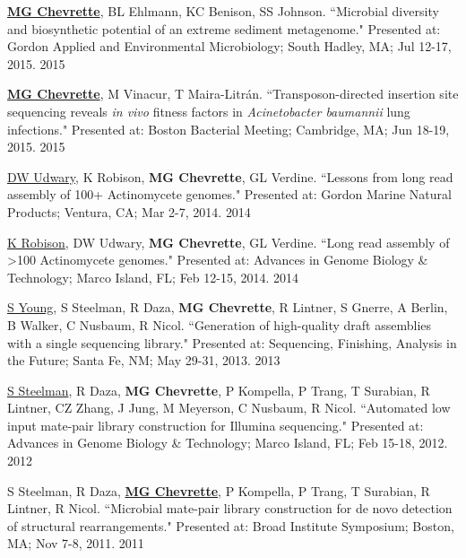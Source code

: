 \begin{cvpubs}
\cvpub
{\textbf{\underline{MG Chevrette}}, BL Ehlmann, KC Benison, SS Johnson. ``Microbial diversity and biosynthetic potential of an extreme sediment metagenome." Presented at: Gordon Applied and Environmental Microbiology; South Hadley, MA; Jul 12-17, 2015.}
{2015}

\cvpub
{\textbf{\underline{MG Chevrette}}, M Vinacur, T Maira-Litr\'{a}n. ``Transposon-directed insertion site sequencing reveals \textit{in vivo} fitness factors in \textit{Acinetobacter baumannii} lung infections." Presented at: Boston Bacterial Meeting; Cambridge, MA; Jun 18-19, 2015.}
{2015}

\cvpub
{\underline{DW Udwary}, K Robison, \textbf{MG Chevrette}, GL Verdine. ``Lessons from long read assembly of 100+ Actinomycete genomes." Presented at: Gordon Marine Natural Products; Ventura, CA; Mar 2-7, 2014.}
{2014}

\cvpub
{\underline{K Robison}, DW Udwary, \textbf{MG Chevrette}, GL Verdine. ``Long read assembly of >100 Actinomycete genomes." Presented at: Advances in Genome Biology \& Technology; Marco Island, FL; Feb 12-15, 2014.}
{2014}

\cvpub
{\underline{S Young}, S Steelman, R Daza, \textbf{MG Chevrette}, R Lintner, S Gnerre, A Berlin, B Walker, C Nusbaum, R Nicol. ``Generation of high-quality draft assemblies with a single sequencing library." Presented at: Sequencing, Finishing, Analysis in the Future; Santa Fe, NM; May 29-31, 2013.}
{2013}

\end{cvpubs} \begin{cvpubs}

\cvpub
{\underline{S Steelman}, R Daza, \textbf{MG Chevrette}, P Kompella, P Trang, T Surabian, R Lintner, CZ Zhang, J Jung, M Meyerson, C Nusbaum, R Nicol. ``Automated low input mate-pair library construction for Illumina sequencing." Presented at: Advances in Genome Biology \& Technology; Marco Island, FL; Feb 15-18, 2012.}
{2012}

\cvpub
{S Steelman, R Daza, \underline{\textbf{MG Chevrette}}, P Kompella, P Trang, T Surabian, R Lintner, R Nicol. ``Microbial mate-pair library construction for de novo detection of structural rearrangements." Presented at: Broad Institute Symposium; Boston, MA; Nov 7-8, 2011.}
{2011}

\end{cvpubs}
